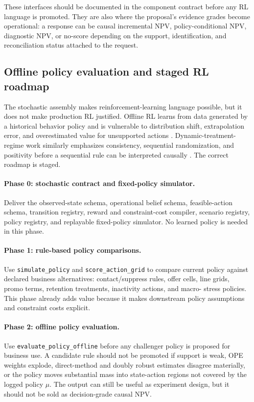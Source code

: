 \documentclass[11pt]{article}
\newcommand{\1}{\mathbf{1}}
\newcommand{\code}[1]{\nolinkurl{#1}}
\begin{document}
These interfaces should be documented in the component contract before any RL
language is promoted. They are also where the proposal's evidence grades become
operational: a response can be causal incremental NPV, policy-conditional NPV,
diagnostic NPV, or no-score depending on the support, identification, and
reconciliation status attached to the request.

\subsection{Offline policy evaluation and staged RL roadmap}
\label{subsec:state-space-ope-rl-roadmap}

The stochastic assembly makes reinforcement-learning language possible, but it
does not make production RL justified. Offline RL learns from data generated by a
historical behavior policy and is vulnerable to distribution shift,
extrapolation error, and overestimated value for unsupported actions
\citep{levine2020offline,fujimoto2019bcq,kumar2020cql}. Dynamic-treatment-regime
work similarly emphasizes consistency, sequential randomization, and positivity
before a sequential rule can be interpreted causally
\citep{murphy2003dynamic,schulte2014qlearning,laber2010inference}. The correct
roadmap is staged.

\paragraph{Phase 0: stochastic contract and fixed-policy simulator.}
Deliver the observed-state schema, operational belief schema, feasible-action
schema, transition registry, reward and constraint-cost compiler, scenario
registry, policy registry, and replayable fixed-policy simulator. No learned
policy is needed in this phase.

\paragraph{Phase 1: rule-based policy comparisons.}
Use \code{simulate_policy} and \code{score_action_grid} to compare current policy
against declared business alternatives: contact/suppress rules, offer cells,
line grids, promo terms, retention treatments, inactivity actions, and macro-
stress policies. This phase already adds value because it makes downstream
policy assumptions and constraint costs explicit.

\paragraph{Phase 2: offline policy evaluation.}
Use \code{evaluate_policy_offline} before any challenger policy is proposed for
business use. A candidate rule should not be promoted if support is weak, OPE
weights explode, direct-method and doubly robust estimates disagree materially,
or the policy moves substantial mass into state-action regions not covered by
the logged policy $\mu$. The output can still be useful as experiment design,
but it should not be sold as decision-grade causal NPV.
\end{document}
